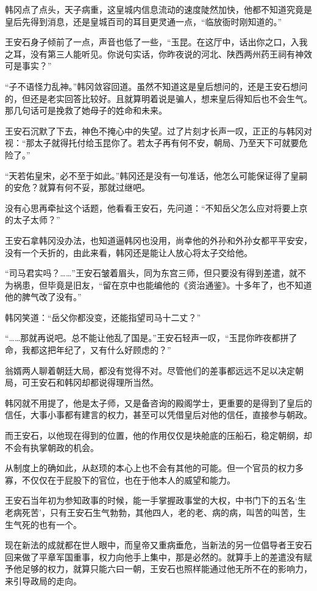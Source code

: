 韩冈点了点头，天子病重，这皇城内信息流动的速度陡然加快，他都不知道究竟是皇后先得到消息，还是皇城百司的耳目更灵通一点，“临放衙时刚知道的。”

王安石身子倾前了一点，声音也低了一些，“玉昆。在这厅中，话出你之口，入我之耳，没有第三人能听见。你说句实话，你昨夜说的河北、陕西两州药王祠有神效可是事实？”

“子不语怪力乱神。”韩冈敛容回道。虽然不知道这是皇后想问的，还是王安石想问的，但还是老实回答比较好。且就算明着说是骗人，想来皇后得知后也不会生气。那几句话可是挽救了她母子的姓命和未来。

王安石沉默了下去，神色不掩心中的失望。过了片刻才长声一叹，正正的与韩冈对视：“那太子就得托付给玉昆你了。若太子再有何不安，朝局、乃至天下可就要危险了。”

“天若佑皇宋，必不至于如此。”韩冈还是没有一句准话，他怎么可能保证得了皇嗣的安危？就算有何不妥，那就过继吧。

没有心思再牵扯这个话题，他看看王安石，先问道：“不知岳父怎么应对将要上京的太子太师？”

王安石拿韩冈没办法，也知道逼韩冈也没用，尚幸他的外孙和外孙女都平平安安，没有一个夭折的，由此来看，韩冈还是能让人放心将太子交给他。

“司马君实吗？……”王安石皱着眉头，同为东宫三师，但只要没有得到差遣，就不为祸患，但毕竟是旧友，“留在京中也能编他的《资治通鉴》。十多年了，也不知道他的脾气改了没有。”

韩冈笑道：“岳父你都没变，还能指望司马十二丈？”

“……那就再说吧。总不能让他乱了国是。”王安石轻声一叹，“玉昆你昨夜都拼了命，我都这把年纪了，又有什么好顾虑的？”

翁婿两人聊着朝廷大局，都没有觉得不对。尽管他们的差事都远远不足以决定朝局，可王安石和韩冈却都说得理所当然。

韩冈就不用提了，他是太子师，又是备咨询的殿阁学士，更重要的是得到了皇后的信任，大事小事都有建言的权力，甚至可以凭借皇后对他的信任，直接参与朝政。

而王安石，以他现在得到的位置，他的作用仅仅是块舱底的压船石，稳定朝纲，却不会有执掌朝政的机会。

从制度上的确如此，从赵顼的本心上也不会有其他的可能。但一个官员的权力多寡，不仅仅在于屁股下的官位，也在于他本人的威望和能力。

王安石当年初为参知政事的时候，能一手掌握政事堂的大权，中书门下的五名‘生老病死苦’，只有王安石生气勃勃，其他四人，老的老、病的病，叫苦的叫苦，生生气死的也有一个。

现在新法的成就都在世人眼中，而皇帝又重病垂危，当新法的另一位倡导者王安石回来做了平章军国重事，权力向他手上集中，那是必然的。就算手上的差遣没有赋予他足够的权力，就算只能六曰一朝，王安石也照样能通过他无所不在的影响力，来引导政局的走向。

